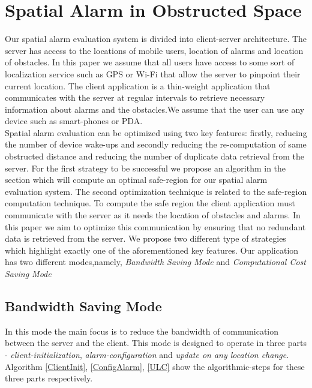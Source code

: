 \documentclass{sig-alternate}
\begin{document}
\section{Spatial Alarm in Obstructed Space}
Our spatial alarm evaluation system is divided into client-server architecture. The server has access to the locations of mobile users, location of alarms and location of obstacles. In this paper we assume that all users have access to some sort of localization service such as GPS or Wi-Fi that allow the server to pinpoint their current location. The client application is a thin-weight application that communicates with the server at regular intervals to retrieve necessary information about alarms and the obstacles.We assume that the user can use any device such as smart-phones or PDA.\\
Spatial alarm evaluation can be optimized using two key features: firstly, reducing the number of device wake-ups and secondly reducing the re-computation of same obstructed distance and reducing the number of duplicate data retrieval from the server. For the first strategy to be successful we propose an algorithm in the section which will compute an optimal safe-region for our spatial alarm evaluation system. The second optimization technique is related to the safe-region computation technique. To compute the safe region the client application must communicate with the server as it needs the location of obstacles and alarms. In this paper we aim to optimize this communication by ensuring that no redundant data is retrieved from the server. We propose two different type of strategies which highlight exactly one of the aforementioned key features. Our application has two different modes,namely, \textit{Bandwidth Saving Mode} and \textit{Computational Cost Saving Mode}

\subsection{Bandwidth Saving Mode}
In this mode the main focus is to reduce the bandwidth of communication between the server and the client. This mode is designed to operate in three parts - \textit{client-initialization}, \textit{alarm-configuration} and \textit{update on any location change}. Algorithm \ref{ClientInit}, \ref{ConfigAlarm}, \ref{ULC} show the algorithmic-steps for these three parts respectively.
\end{document}
